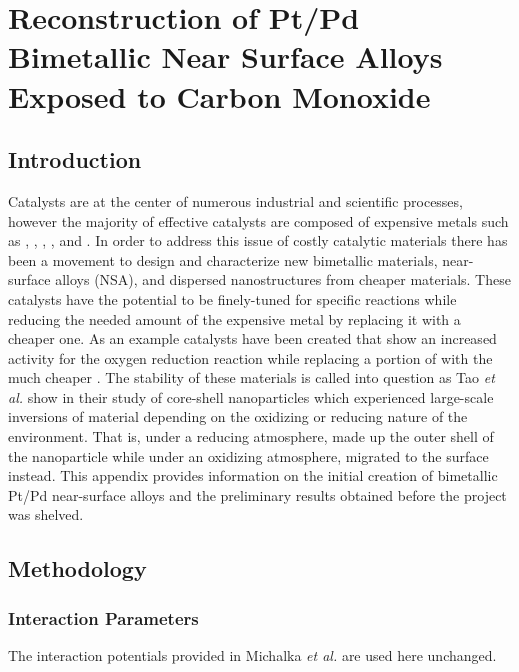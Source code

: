 
\chapter{Reconstruction of Pt/Pd Bimetallic Near Surface Alloys Exposed to Carbon Monoxide}


\section{Introduction}


Catalysts are at the center of numerous industrial and scientific processes,
however the majority of effective catalysts are composed of expensive metals
such as , , , , and .  In order to address
this issue of costly catalytic materials there has been a movement to design
and characterize new bimetallic materials,\citep{} near-surface alloys
(NSA),\citep{} and dispersed nanostructures\citep{} from cheaper materials.
These catalysts have the potential to be finely-tuned for specific reactions
while reducing the needed amount of the expensive metal by replacing it with a
cheaper one. As an example  catalysts have been created that show an
increased activity for the oxygen reduction reaction while replacing a portion
of  with the much cheaper . The stability of these materials is
called into question as Tao {\em et al.} show in their study of 
core-shell nanoparticles which experienced large-scale inversions of material
depending on the oxidizing or reducing nature of the
environment.\citep{Tao:2008aa} That is, under a reducing atmosphere, \ce{} made
up the outer shell of the nanoparticle while under an oxidizing atmosphere,
\ce{} migrated to the surface instead. This appendix provides information on
the initial creation of bimetallic Pt/Pd near-surface alloys and the
preliminary results obtained before the project was shelved.

\section{Methodology}

\subsection{Interaction Parameters}
The interaction potentials provided in Michalka {\em et
al.}\citep{Michalka:2015aa} are used here unchanged.




